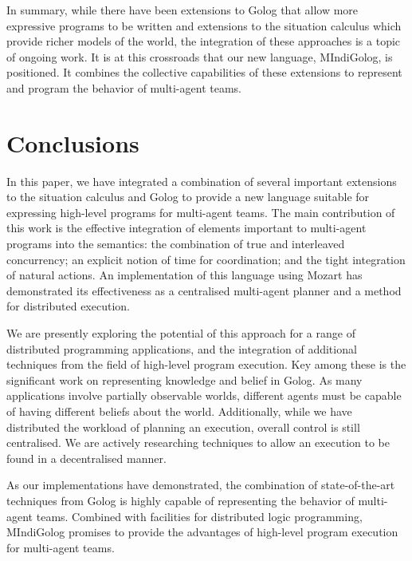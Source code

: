 \documentclass[letterpaper]{article}
\begin{document}
In summary, while there have been extensions to Golog that allow more
expressive programs to be written and extensions to the situation
calculus which provide richer models of the world, the integration
of these approaches is a topic of ongoing work. It is at this crossroads
that our new language, MIndiGolog, is positioned. It combines the
collective capabilities of these extensions to represent and program
the behavior of multi-agent teams.


\section{Conclusions}

In this paper, we have integrated a combination of several important
extensions to the situation calculus and Golog to provide a new language
suitable for expressing high-level programs for multi-agent teams.
The main contribution of this work is the effective integration of
elements important to multi-agent programs into the semantics: the
combination of true and interleaved concurrency; an explicit notion
of time for coordination; and the tight integration of natural actions.
An implementation of this language using Mozart has demonstrated its
effectiveness as a centralised multi-agent planner and a method for
distributed execution. 

We are presently exploring the potential of this approach for a range
of distributed programming applications, and the integration of additional
techniques from the field of high-level program execution. Key among
these is the significant work on representing knowledge and belief
in Golog. As many applications involve partially observable worlds,
different agents must be capable of having different beliefs about
the world. Additionally, while we have distributed the workload of
planning an execution, overall control is still centralised. We are
actively researching techniques to allow an execution to be found
in a decentralised manner.

As our implementations have demonstrated, the combination of state-of-the-art
techniques from Golog is highly capable of representing the behavior
of multi-agent teams. Combined with facilities for distributed logic
programming, MIndiGolog promises to provide the advantages of high-level
program execution for multi-agent teams.



\end{document}
